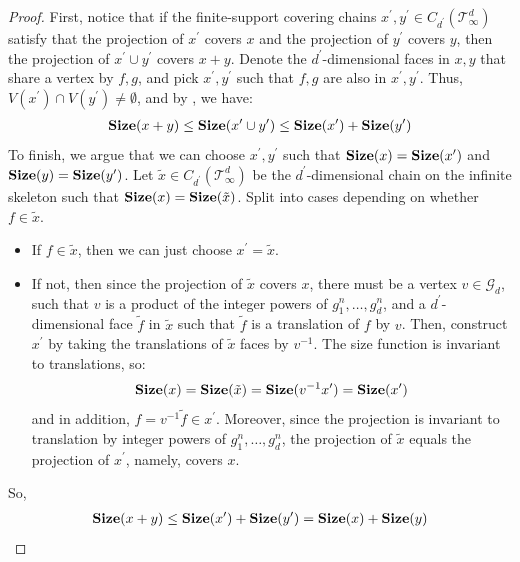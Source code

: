 \begin{proof}
  First, notice that if the finite-support covering chains $x^{\prime}, y^{\prime} \in C_{d^{\prime}}(\mathcal T_\infty^d)$ satisfy that the projection of $x^{\prime}$ covers $x$ and the projection of $y^{\prime}$ covers $y$, then the projection of $x^{\prime} \cup y^{\prime}$ covers $x+y$. Denote the $d^{\prime}$-dimensional faces in $x, y$ that share a vertex by $f,g$, and pick $x^{\prime}, y^{\prime}$ such that $f, g$ are also in $x^{\prime}, y^{\prime}$. Thus, $V(x^{\prime})\cap V(y^{\prime}) \neq \emptyset$, and by , we have:
  \begin{equation*}
    \begin{split}
      \mathbf{Size}(x + y) \le \mathbf{Size}(x^{\prime} \cup y^{\prime}) \le \mathbf{Size}(x^{\prime}) + \mathbf{Size}(y^{\prime})
    \end{split}
  \end{equation*}
To finish, we argue that we can choose $x^{\prime}, y^{\prime}$ such that $\mathbf{Size}(x) = \mathbf{Size}(x^{\prime})$ and $\mathbf{Size}(y) = \mathbf{Size}(y^{\prime})$. Let $\tilde{x} \in C_{d^{\prime}}(\mathcal T_\infty^d)$ be the $d^{\prime}$-dimensional chain on the infinite skeleton such that $\mathbf{Size}(x) = \mathbf{Size}(\tilde{x})$. Split into cases depending on whether $f \in \tilde{x}$.
  \begin{itemize}
    \item If $f \in \tilde{x}$, then we can just choose $x^{\prime} = \tilde{x}$.
    \item If not, then since the projection of $\tilde{x}$ covers $x$, there must be a vertex $v \in \mathcal{G}_{d}$, such that $v$ is a product of the integer powers of $g_{1}^{n},\ldots, g_{d}^{n}$, and a $d^{\prime}$-dimensional face $\tilde{f}$ in $\tilde{x}$ such that $\tilde{f}$ is a translation of $f$ by $v$. Then, construct $x^{\prime}$ by taking the translations of $\tilde{x}$ faces by $v^{-1}$. The size function is invariant to translations, so:
      \begin{equation*}
        \begin{split}
          \mathbf{Size}(x) = \mathbf{Size}(\tilde{x}) = \mathbf{Size}(v^{-1} x^{\prime}  ) = \mathbf{Size}(x^{\prime})
        \end{split}
      \end{equation*}
      and in addition, $f = v^{-1}\tilde{f} \in x^{\prime}$. Moreover, since the projection is invariant to translation by integer powers of $g_{1}^{n},\ldots, g_{d}^{n}$, the projection of $\tilde{x}$ equals the projection of $x^{\prime}$, namely, covers $x$.
  \end{itemize}
  So, 
  \begin{equation*}
    \begin{split}
      \mathbf{Size}(x + y) \le \mathbf{Size}(x^{\prime}) + \mathbf{Size}(y^{\prime}) = \mathbf{Size}(x) + \mathbf{Size}(y)
    \end{split}
  \end{equation*}
\end{proof}


